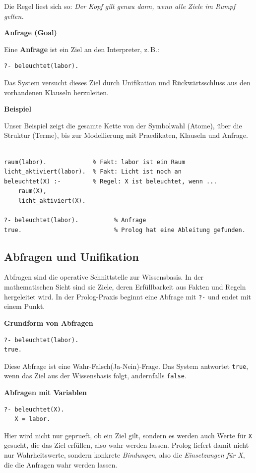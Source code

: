 \documentclass[parskip=half,a4paper,11pt]{scrreprt}
\begin{document}
Die Regel liest sich so: \textit{Der Kopf gilt genau dann, wenn alle Ziele im Rumpf gelten.}

\textbf{Anfrage (Goal)}

Eine \textbf{Anfrage} ist ein Ziel an den Interpreter, z.\,B.:
\begin{lstlisting}[caption={}]
?- beleuchtet(labor).
\end{lstlisting}
Das System versucht dieses Ziel durch Unifikation und Rückwärtsschluss aus den vorhandenen Klauseln herzuleiten.

\textbf{Beispiel}

Unser Beispiel zeigt die gesamte Kette von der Symbolwahl (Atome), über die Struktur (Terme), bis zur Modellierung mit Praedikaten, Klauseln und Anfrage.\\

\begin{lstlisting}[caption={}]
% Kommentare beginnen mit % und werden vom Interpreter ignroriert.

raum(labor).             % Fakt: labor ist ein Raum
licht_aktiviert(labor).  % Fakt: Licht ist noch an
beleuchtet(X) :-         % Regel: X ist beleuchtet, wenn ...
    raum(X), 
    licht_aktiviert(X).

?- beleuchtet(labor).          % Anfrage
true.                          % Prolog hat eine Ableitung gefunden.
\end{lstlisting}

\subsection{Abfragen und Unifikation}
Abfragen sind die operative Schnittstelle zur Wissensbasis. In der mathematischen Sicht sind sie Ziele, deren Erfüllbarkeit aus Fakten und Regeln hergeleitet wird. In der Prolog-Praxis beginnt eine Abfrage mit \texttt{?-} und endet mit einem Punkt.

\textbf{Grundform von Abfragen}
\begin{lstlisting}
?- beleuchtet(labor).
true.
\end{lstlisting}
Diese Abfrage ist eine Wahr-Falsch(Ja-Nein)-Frage. Das System antwortet \texttt{true}, wenn das Ziel aus der Wissensbasis folgt, andernfalls \texttt{false}.

\textbf{Abfragen mit Variablen}
\begin{lstlisting}
?- beleuchtet(X).
   X = labor.
\end{lstlisting}
Hier wird nicht nur geprueft, ob ein Ziel gilt, sondern es werden auch Werte für \texttt{X} gesucht, die das Ziel erfüllen, also wahr werden lassen. Prolog liefert damit nicht nur Wahrheitswerte, sondern konkrete \textit{Bindungen}, also die \textit{Einsetzungen für X}, die die Anfragen wahr werden lassen.
\end{document}
